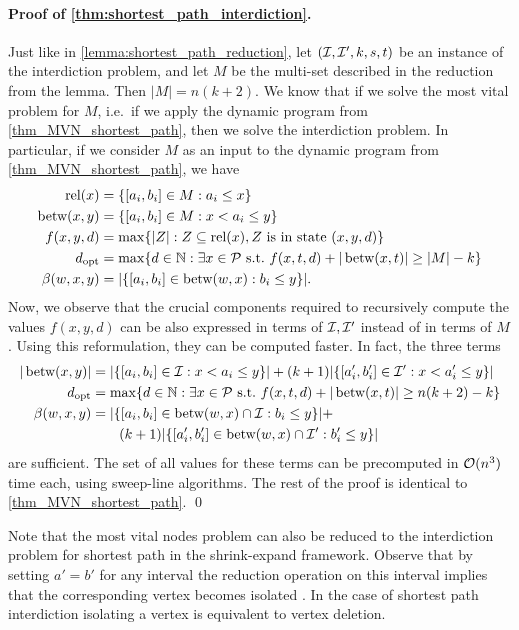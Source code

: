 \paragraph*{Proof of \cref{thm:shortest_path_interdiction}.}
Just like in \cref{lemma:shortest_path_reduction}, let $(\mathcal{I}, \mathcal{I}', k, s,t)$ be an instance of the interdiction problem, and let $M$ be the multi-set described in the reduction from the lemma. Then $|M| = n(k+2)$. We know that if we solve the most vital  problem for $M$, i.e.\ if we apply the dynamic program from \cref{thm_MVN_shortest_path}, then we solve the interdiction problem. In particular, if we consider $M$ as an input to the dynamic program from \cref{thm_MVN_shortest_path}, we have 
\begin{align*}
\operatorname{\text{rel}}(x) &= \{ [a_i, b_i] \in M : a_i \leq x \}\\
\operatorname{\text{betw}}(x, y) &= \{ [a_i, b_i] \in M : x < a_i \leq y \}\\
f(x,y,d) &= \max\{ |Z| : Z \subseteq \operatorname{\text{rel}}(x), Z \text{ is in state } (x,y,d) \}\\
d_{\text{opt}} &=  \max\{ d \in \mathbb{N} : \exists x \in \mathcal{P} \text{ s.t.\ } f(x,t,d) + |\operatorname{\text{betw}}(x, t)| \geq |M| - k \}\\
\beta(w,x,y) &= |\{ [a_i, b_i] \in \operatorname{\text{betw}}(w,x) : b_i \leq y \}|.
\end{align*}
Now, we observe that the crucial components required to recursively compute the values $f(x,y,d)$ can be also expressed in terms of $\mathcal{I}, \mathcal{I}'$ instead of in terms of $M$. Using this reformulation, they can be computed faster. In fact, the three terms
\begin{align*}
|\operatorname{\text{betw}}(x, y)| &= |\{ [a_i, b_i] \in \mathcal{I} : x < a_i \leq y \}| + (k+1)|\{ [a'_i, b'_i] \in \mathcal{I}' : x < a'_i \leq y \}|\\
d_{\text{opt}} &=  \max\{ d \in \mathbb{N} : \exists x \in \mathcal{P} \text{ s.t.\ } f(x,t,d) + |\operatorname{\text{betw}}(x, t)| \geq n(k+2) - k \}\\
\beta(w,x,y) &= |\{ [a_i, b_i] \in \operatorname{\text{betw}}(w,x)\cap \mathcal{I} : b_i \leq y \}| + \\
&\qquad (k+1)|\{ [a'_i, b'_i] \in \operatorname{\text{betw}}(w,x)\cap \mathcal{I}' : b'_i \leq y \}|
\end{align*}
are sufficient. The set of all values for these terms can be precomputed in $\mathcal{O}(n^3)$ time each, using sweep-line algorithms. The rest of the proof is identical to \cref{thm_MVN_shortest_path}.
\qed

Note that the most vital nodes problem can also be reduced to the interdiction  problem  for  shortest  path in the shrink-expand framework.
Observe that by setting $a'=b'$ for any interval the reduction operation 
on this interval implies that the corresponding vertex becomes isolated . 
In the case of shortest path interdiction isolating a vertex is equivalent to vertex deletion.

